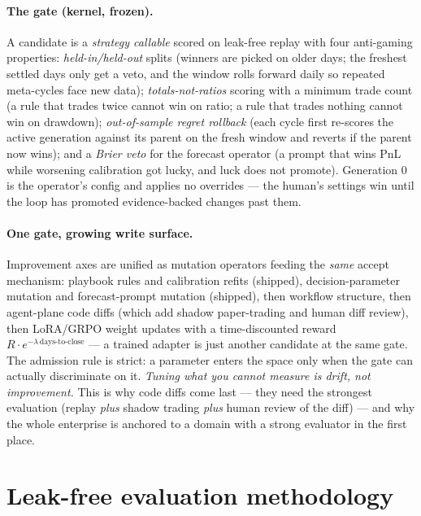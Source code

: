 \documentclass[sigconf,review,anonymous]{acmart}
\begin{document}
\paragraph{The gate (kernel, frozen).} A candidate is a \emph{strategy callable}
scored on leak-free replay with four anti-gaming properties:
\emph{held-in/held-out} splits (winners are picked on older days; the freshest
settled days only get a veto, and the window rolls forward daily so repeated
meta-cycles face new data); \emph{totals-not-ratios} scoring with a minimum trade
count (a rule that trades twice cannot win on ratio; a rule that trades nothing
cannot win on drawdown); \emph{out-of-sample regret rollback} (each cycle first
re-scores the active generation against its parent on the fresh window and reverts
if the parent now wins); and a \emph{Brier veto} for the forecast operator (a
prompt that wins PnL while worsening calibration got lucky, and luck does not
promote). Generation 0 is the operator's config and applies no overrides --- the
human's settings win until the loop has promoted evidence-backed changes past
them.

\paragraph{One gate, growing write surface.} Improvement axes are unified as
mutation operators feeding the \emph{same} accept mechanism: playbook rules and
calibration refits (shipped), decision-parameter mutation and forecast-prompt
mutation (shipped), then workflow structure, then agent-plane code diffs (which
add shadow paper-trading and human diff review), then LoRA/GRPO weight updates
with a time-discounted reward $R\cdot e^{-\lambda\,\text{days-to-close}}$ --- a
trained adapter is just another candidate at the same gate. The admission rule is
strict: a parameter enters the space only when the gate can actually discriminate
on it. \emph{Tuning what you cannot measure is drift, not improvement.} This is
why code diffs come last --- they need the strongest evaluation (replay \emph{plus}
shadow trading \emph{plus} human review of the diff) --- and why the whole
enterprise is anchored to a domain with a strong evaluator in the first place.

\section{Leak-free evaluation methodology}
\label{sec:eval}
\end{document}

